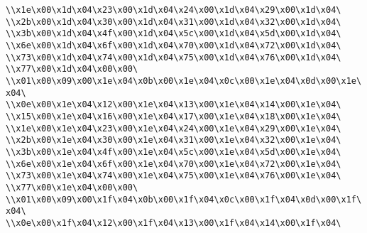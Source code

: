 \verb|\\x1e\x00\x1d\x04\x23\x00\x1d\x04\x24\x00\x1d\x04\x29\x00\x1d\x04\|\newline
\verb|\\x2b\x00\x1d\x04\x30\x00\x1d\x04\x31\x00\x1d\x04\x32\x00\x1d\x04\|\newline
\verb|\\x3b\x00\x1d\x04\x4f\x00\x1d\x04\x5c\x00\x1d\x04\x5d\x00\x1d\x04\|\newline
\verb|\\x6e\x00\x1d\x04\x6f\x00\x1d\x04\x70\x00\x1d\x04\x72\x00\x1d\x04\|\newline
\verb|\\x73\x00\x1d\x04\x74\x00\x1d\x04\x75\x00\x1d\x04\x76\x00\x1d\x04\|\newline
\verb|\\x77\x00\x1d\x04\x00\x00\|\newline
\verb|\\x01\x00\x09\x00\x1e\x04\x0b\x00\x1e\x04\x0c\x00\x1e\x04\x0d\x00\x1e\x04\|\newline
\verb|\\x0e\x00\x1e\x04\x12\x00\x1e\x04\x13\x00\x1e\x04\x14\x00\x1e\x04\|\newline
\verb|\\x15\x00\x1e\x04\x16\x00\x1e\x04\x17\x00\x1e\x04\x18\x00\x1e\x04\|\newline
\verb|\\x1e\x00\x1e\x04\x23\x00\x1e\x04\x24\x00\x1e\x04\x29\x00\x1e\x04\|\newline
\verb|\\x2b\x00\x1e\x04\x30\x00\x1e\x04\x31\x00\x1e\x04\x32\x00\x1e\x04\|\newline
\verb|\\x3b\x00\x1e\x04\x4f\x00\x1e\x04\x5c\x00\x1e\x04\x5d\x00\x1e\x04\|\newline
\verb|\\x6e\x00\x1e\x04\x6f\x00\x1e\x04\x70\x00\x1e\x04\x72\x00\x1e\x04\|\newline
\verb|\\x73\x00\x1e\x04\x74\x00\x1e\x04\x75\x00\x1e\x04\x76\x00\x1e\x04\|\newline
\verb|\\x77\x00\x1e\x04\x00\x00\|\newline
\verb|\\x01\x00\x09\x00\x1f\x04\x0b\x00\x1f\x04\x0c\x00\x1f\x04\x0d\x00\x1f\x04\|\newline
\verb|\\x0e\x00\x1f\x04\x12\x00\x1f\x04\x13\x00\x1f\x04\x14\x00\x1f\x04\|\newline
